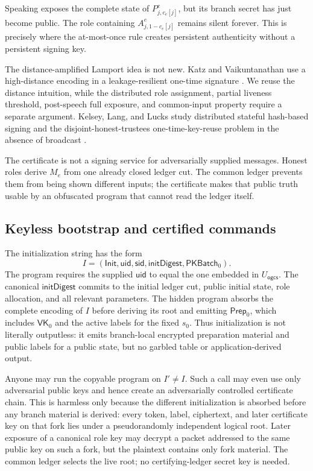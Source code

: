Speaking exposes the complete state of $P^e_{j,c_e[j]}$, but its branch secret
has just become public.  The role containing $A^e_{j,1-c_e[j]}$ remains
silent forever.  This is precisely where the at-most-once rule creates
persistent authenticity without a persistent signing key.

The distance-amplified Lamport idea is not new.  Katz and Vaikuntanathan use a
high-distance encoding in a leakage-resilient one-time signature
\cite{KatzVaikuntanathan2009LeakageSignatures}.  We reuse the distance
intuition, while the distributed role assignment, partial liveness threshold,
post-speech full exposure, and common-input property require a separate
argument.  Kelsey, Lang, and Lucks study distributed stateful hash-based
signing and the disjoint-honest-trustees one-time-key-reuse problem in the
absence of broadcast \cite{KelseyLangLucks2025DistributedHBS}.

The certificate is not a signing service for adversarially supplied messages.
Honest roles derive $M_e$ from one already closed ledger cut.  The common
ledger prevents them from being shown different inputs; the certificate makes
that public truth usable by an obfuscated program that cannot read the ledger
itself.

\subsection{Keyless bootstrap and certified commands}

The initialization string has the form
\[
  I=(\mathsf{Init},\mathsf{uid},\mathsf{sid},
       \mathsf{initDigest},\mathsf{PKBatch}_0).
\]
The program requires the supplied $\mathsf{uid}$ to equal the one embedded in
$U_{\mathsf{ogcs}}$.  The canonical $\mathsf{initDigest}$ commits to the
initial ledger cut, public initial state, role allocation, and all relevant
parameters.  The hidden program absorbs the complete encoding of $I$ before
deriving its root and emitting $\mathsf{Prep}_0$, which includes
$\mathsf{VK}_0$ and the active labels for the fixed $s_0$.  Thus initialization
is not literally outputless: it emits branch-local encrypted preparation
material and public labels for a public state, but no garbled table or
application-derived output.

Anyone may run the copyable program on $I'\neq I$.  Such a call may even use
only adversarial public keys and hence create an adversarially controlled
certificate chain.  This is harmless only because the different
initialization is absorbed before any branch material is derived: every
token, label, ciphertext, and later certificate key on that fork lies under a
pseudorandomly independent logical root.  Later exposure of a canonical role
key may decrypt a packet addressed to the same public key on such a fork, but
the plaintext contains only fork material.  The common ledger selects the
live root; no certifying-ledger secret key is needed.

